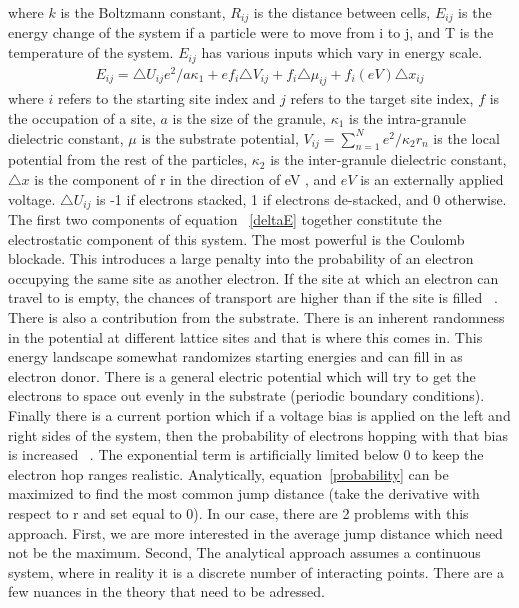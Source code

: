 where $k$ is the Boltzmann constant, $R_{ij}$ is the distance between cells, $E_{ij}$ is the energy change of the system if a particle were to move from i to j, and T is the temperature of the system. $E_{ij}$ has various inputs which vary in energy scale.
\begin{eqnarray}
E_{ij} =  \triangle U_{ij} e^2/a\kappa_1  + e f_i \triangle V_{ij} + f_i  \triangle \mu_{ij} + f_i (eV) \triangle x_{ij} 
\label{deltaE}
\end{eqnarray}
where $i$ refers to the starting site index and $j$ refers to the target site index,  $f$ is the occupation of a site, $a$ is the size of the granule, $\kappa_1$ is the intra-granule dielectric constant, $\mu$ is the substrate potential, $V_{ij} = \sum_{n=1}^{N} e^2/\kappa_2 r_{n}$ is the local potential from the rest of the particles, $\kappa_2$ is the inter-granule dielectric constant, $\triangle x$ is the component of r in the direction of eV , and $eV$ is an externally applied voltage. $\triangle U_{ij}$ is -1 if electrons stacked, 1 if electrons de-stacked, and 0 otherwise. The first two components of equation ~\ref{deltaE} together constitute the electrostatic component of this system. The most powerful is the Coulomb blockade. This introduces a large penalty into the probability of an electron occupying the same site as another electron. If the site at which an electron can travel to is empty, the chances of transport are higher than if the site is filled ~\cite{glazman05}. There is also a contribution from the substrate. There is an inherent randomness in the potential at different lattice sites and that is where this comes in. This energy landscape somewhat randomizes starting energies and can fill in as electron donor. There is a general electric potential which will try to get the electrons to space out evenly in the substrate (periodic boundary conditions). Finally there is a current portion which if a voltage bias is applied on the left and right sides of the system, then the probability of electrons hopping with that bias is increased ~\cite{aharony92}. The exponential term is artificially limited below 0 to keep the electron hop ranges realistic. Analytically, equation~\ref{probability} can be maximized to find the most common jump distance (take the derivative with respect to r and set equal to 0). In our case, there are 2 problems with this approach. First, we are more interested in the average jump distance which need not be the maximum. Second, The analytical approach assumes a continuous system, where in reality it is a discrete number of interacting points. There are a few nuances in the theory that need to be adressed.
